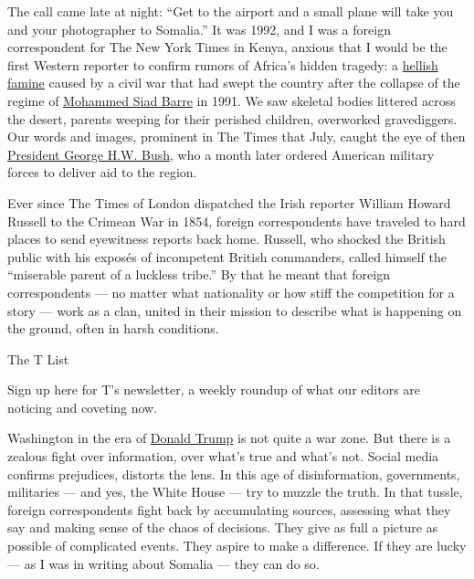 The call came late at night: ``Get to the airport and a small plane will
take you and your photographer to Somalia.'' It was 1992, and I was a
foreign correspondent for The New York Times in Kenya, anxious that I
would be the first Western reporter to confirm rumors of Africa's hidden
tragedy: a
\href{https://www.nytimes3xbfgragh.onion/1992/07/19/world/deaths-in-somalia-outpace-delivery-of-food.html}{hellish
famine} caused by a civil war that had swept the country after the
collapse of the regime of
\href{https://www.nytimes3xbfgragh.onion/1995/01/03/obituaries/somalia-s-overthrown-dictator-mohammed-siad-barre-is-dead.html}{Mohammed
Siad Barre} in 1991. We saw skeletal bodies littered across the desert,
parents weeping for their perished children, overworked gravediggers.
Our words and images, prominent in The Times that July, caught the eye
of then
\href{https://www.nytimes3xbfgragh.onion/2018/11/30/us/politics/george-hw-bush-dies.html}{President
George H.W. Bush}, who a month later ordered American military forces to
deliver aid to the region.

Ever since The Times of London dispatched the Irish reporter William
Howard Russell to the Crimean War in 1854, foreign correspondents have
traveled to hard places to send eyewitness reports back home. Russell,
who shocked the British public with his exposés of incompetent British
commanders, called himself the ``miserable parent of a luckless tribe.''
By that he meant that foreign correspondents --- no matter what
nationality or how stiff the competition for a story --- work as a clan,
united in their mission to describe what is happening on the ground,
often in harsh conditions.

The T List \textbar{}

Sign up here for T's newsletter, a weekly roundup of what our editors
are noticing and coveting now.

Washington in the era of
\href{https://www.nytimes3xbfgragh.onion/topic/person/donald-trump}{Donald
Trump} is not quite a war zone. But there is a zealous fight over
information, over what's true and what's not. Social media confirms
prejudices, distorts the lens. In this age of disinformation,
governments, militaries --- and yes, the White House --- try to muzzle
the truth. In that tussle, foreign correspondents fight back by
accumulating sources, assessing what they say and making sense of the
chaos of decisions. They give as full a picture as possible of
complicated events. They aspire to make a difference. If they are lucky
--- as I was in writing about Somalia --- they can do so.

